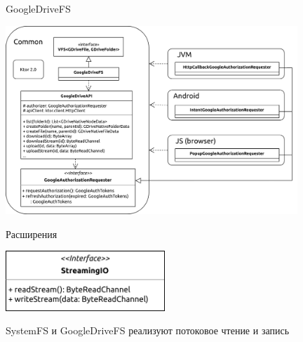 \documentclass[14pt,aspectratio=169,hyperref={pdftex,unicode},xcolor=dvipsnames]{beamer}
\begin{document}
\begin{frame}{GoogleDriveFS}
\begin{center}
\includegraphics[width=11cm,keepaspectratio]{gdrive-multiplatform-arch}
\end{center}
\end{frame}




\begin{frame}{Расширения}
  \begin{center}
    \includegraphics[width=6cm,keepaspectratio]{streamingio}
  \end{center}
  \small SystemFS и GoogleDriveFS реализуют потоковое чтение и запись
\end{frame}
  
\end{document}
